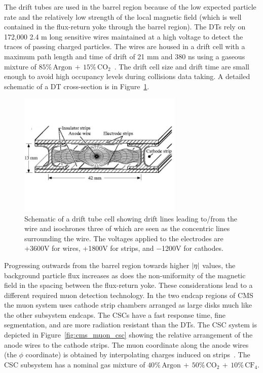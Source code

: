 The drift tubes are used in the barrel region
because of the low expected particle rate and the relatively low strength of the local
magnetic field (which is well contained in the flux-return yoke through the barrel region).
The DTs rely on 172,000 2.4 m long sensitive wires maintained at a high voltage to detect the traces
of passing charged particles. The wires are housed in a drift cell with a maximum path length
and time of drift of 21 mm and 380 ns using a gaseous mixture of 
$85\% \, \textrm{Argon} \, + \, 15\% \, \textrm{CO}_{2}$~\cite{CMS-Proposal}. The drift cell size and drift
time are small enough to avoid high occupancy levels during collisions data taking.
A detailed schematic of a DT cross-section is in Figure~\ref{fig:cms_muon_dt}.

\begin{figure}[htbp]
\centering
     \includegraphics[width=0.7\textwidth]{cms_and_lhc/plots/cms_muon_dt.jpg}
     \caption{
Schematic of a drift tube cell showing drift lines leading to/from the wire 
and isochrones three of which are seen as the concentric lines surrounding the wire. The voltages applied to the 
electrodes are +3600V for wires, +1800V for strips, and −1200V for cathodes.
     }
     \label{fig:cms_muon_dt}
\end{figure}

Progressing outwards from the barrel region towards higher $\lvert\eta\rvert$ values, the background 
particle flux increases as does the non-uniformity of the magnetic field in the spacing between
the flux-return yoke. These considerations lead to a different required muon detection technology.
In the two endcap regions of CMS the muon system uses cathode strip chambers arranged as large
disks much like the other subsystem endcaps. The CSCs have a fast 
response time, fine segmentation, and are more radiation resistant than the DTs. The CSC system
is depicted in Figure~\ref{fig:cms_muon_csc} showing the relative arrangement of the anode
wires to the cathode strips. The muon coordinate along the anode wires (the $\phi$ coordinate) 
is obtained by interpolating charges induced on strips~\cite{cms_csc_gas}.
The CSC subsystem has a nominal gas mixture of 
$40\% \, \textrm{Argon} \, + \, 50\% \, \textrm{CO}_{2} \, + \, 10\% \, \textrm{CF}_{4}$.


